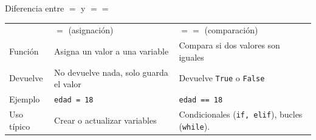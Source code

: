 \documentclass{beamer}
\begin{document}
    \begin{frame}[fragile,t]{Diferencia entre $=$ y $==$}
        \begin{tabular}{m{} m{} m{}}
             & $=$ (asignación) & $==$ (comparación) \\
            Función & Asigna un valor a una variable & Compara si dos valores son iguales \\
            Devuelve & No devuelve nada, solo guarda el valor & Devuelve \texttt{True} o \texttt{False} \\
            Ejemplo & \texttt{edad = 18} & \texttt{edad == 18} \\
            Uso típico & Crear o actualizar variables & Condicionales (\texttt{if, elif}), bucles (\texttt{while}).\\
        \end{tabular}
    \end{frame}


        


        
\end{document}
